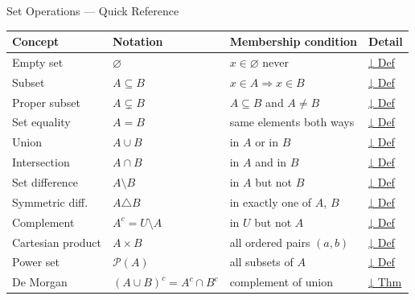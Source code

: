 \begin{toolkitbox}{Set Operations — Quick Reference}
\small
\begin{tabular}{l l l l}
\toprule
\textbf{Concept} & \textbf{Notation} & \textbf{Membership condition} & \textbf{Detail} \\
\midrule
Empty set        & $\varnothing$             & $x \in \varnothing$ never         & \hyperref[def:empty-set]{↓ Def} \\
Subset           & $A \subseteq B$           & $x \in A \Rightarrow x \in B$     & \hyperref[def:subset]{↓ Def} \\
Proper subset    & $A \subsetneq B$          & $A \subseteq B$ and $A \neq B$    & \hyperref[def:proper-subset]{↓ Def} \\
Set equality     & $A = B$                   & same elements both ways            & \hyperref[def:set-equality]{↓ Def} \\
Union            & $A \cup B$                & in $A$ or in $B$                  & \hyperref[def:union]{↓ Def} \\
Intersection     & $A \cap B$                & in $A$ and in $B$                 & \hyperref[def:intersection]{↓ Def} \\
Set difference   & $A \setminus B$           & in $A$ but not $B$                & \hyperref[def:set-difference]{↓ Def} \\
Symmetric diff.  & $A \triangle B$           & in exactly one of $A$, $B$        & \hyperref[def:sym-diff]{↓ Def} \\
Complement       & $A^c = U \setminus A$     & in $U$ but not $A$                & \hyperref[def:complement]{↓ Def} \\
Cartesian product& $A \times B$              & all ordered pairs $(a,b)$         & \hyperref[def:cartesian-product]{↓ Def} \\
Power set        & $\mathcal{P}(A)$          & all subsets of $A$                & \hyperref[def:power-set]{↓ Def} \\
De Morgan        & $(A \cup B)^c = A^c \cap B^c$ & complement of union        & \hyperref[thm:de-morgan]{↓ Thm} \\
\bottomrule
\end{tabular}
\end{toolkitbox}




